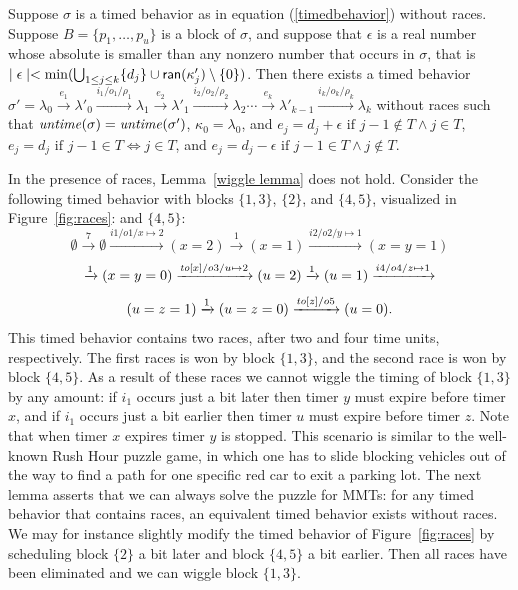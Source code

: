 \begin{lemma}
\label{wiggle lemma}
Suppose $\sigma$ is a timed behavior as in equation (\ref{timedbehavior}) without races.
Suppose $B = \{ p_1 ,\ldots, p_u \}$ is a block of $\sigma$, and suppose
that $\epsilon$ is a real number whose absolute is smaller than any nonzero number that occurs in $\sigma$, that is
$\mid \epsilon \mid  < \min (\bigcup_{1 \leq j \leq k} \{ d_j \} \cup {\textsf{ran}}(\kappa'_j) \setminus \{ 0 \} )$.
Then there exists a timed behavior
$\sigma'  =  \lambda_0 \xrightarrow{e_1} \lambda'_0 \xrightarrow{i_1/o_1/\rho_1} \lambda_1 \xrightarrow{e_2} \lambda'_1 \xrightarrow{i_2/o_2/ \rho_2} \lambda_2 \cdots
\xrightarrow{e_k} \lambda'_{k-1} \xrightarrow{i_k/o_k/\rho_k} \lambda_{k}$
without races such that
$\mathit{untime}(\sigma)=\mathit{untime}(\sigma')$,
$\kappa_0 = \lambda_0$, and
$e_j  =  d_j + \epsilon  \mbox{ if } j-1 \not\in T \wedge j \in T$,
$e_j = d_j  \mbox{ if } j-1 \in T \Leftrightarrow j \in T$, and
$e_j = d_j - \epsilon  \mbox{ if } j-1 \in T \wedge j \not\in T$.
\end{lemma}
In the presence of races, Lemma~\ref{wiggle lemma} does not hold. 
Consider the following timed behavior with blocks $\{ 1, 3 \}$, $\{ 2 \}$,
\iflong 
and $\{ 4, 5 \}$, visualized in Figure~\ref{fig:races}:
\else
and $\{ 4, 5 \}$:
\fi
\[
\emptyset \xrightarrow{7} \emptyset \xrightarrow{i1/o1/x \mapsto 2} (x=2) \xrightarrow{1} (x=1)
\xrightarrow{i2/o2/y \mapsto 1} (x=y=1)  
\]
\[
\xrightarrow{1} (x=y=0)
\xrightarrow{\mathit{to}[x]/o3/u \mapsto 2} (u=2)
\xrightarrow{1} (u=1)
\xrightarrow{i4/o4/z \mapsto 1} 
\]
\[
(u=z=1)
\xrightarrow{1} (u=z=0)\xrightarrow{\mathit{to}[z]/o5} (u=0).
\]
This timed behavior contains two races, after two and four time units, respectively.
The first races is won by block $\{ 1, 3 \}$, and the second race is won by block $\{ 4, 5 \}$.
As a result of these races we cannot wiggle the timing of block $\{ 1, 3 \}$ by any amount:
if $i_1$ occurs just a bit later then timer $y$ must expire before timer $x$,
and if $i_1$ occurs just a bit earlier then timer $u$ must expire before timer $z$.
Note that when timer $x$ expires timer $y$ is stopped.
This scenario is similar to the well-known Rush Hour puzzle game,
in which one has to slide blocking vehicles out of the way to find a path for one specific red car to exit a parking lot.
The next lemma asserts that we can always solve the puzzle for MMTs: for any timed behavior that contains races,
an equivalent timed behavior exists without races.
We may for instance slightly modify the timed behavior
of Figure~\ref{fig:races} 
by scheduling block $\{ 2  \}$
a bit later and block $\{ 4, 5 \}$ a bit earlier.
Then all races have been eliminated and we can wiggle block $\{ 1, 3 \}$.


